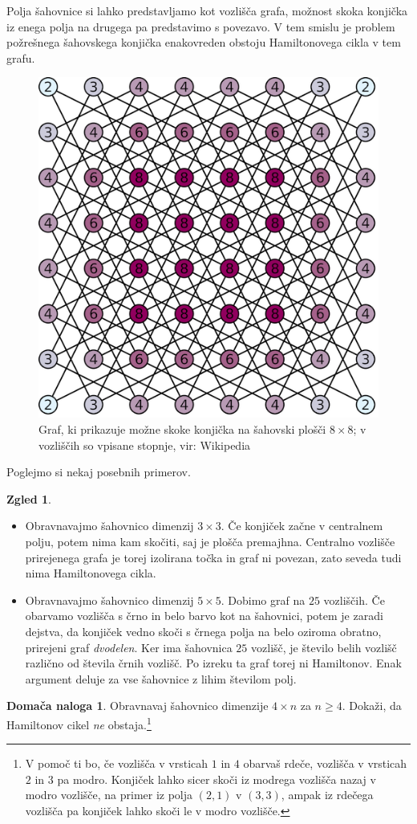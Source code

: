 \documentclass[11pt]{book}
\theoremstyle{definition}
\theoremstyle{zgled}
\newtheorem*{zgled}{Zgled}
\theoremstyle{odprtproblem}
\theoremstyle{domacanaloga}
\newtheorem*{domacanaloga}{Domača naloga}
\theoremstyle{izrek}
\begin{document}
Polja šahovnice si lahko predstavljamo kot vozlišča grafa, možnost skoka konjička iz enega polja na drugega pa predstavimo s povezavo. V tem smislu je problem požrešnega šahovskega konjička enakovreden obstoju Hamiltonovega cikla v tem grafu.

\begin{figure}[h]
    \centering
    \includegraphics[width=0.5\linewidth]{img/grafi-konjicek-graf.png}
    \caption{Graf, ki prikazuje možne skoke konjička na šahovski plošči $8 \times 8$; v vozliščih so vpisane stopnje, vir: Wikipedia}
\end{figure}    

Poglejmo si nekaj posebnih primerov.

\begin{zgled} \leavevmode
\begin{itemize}
    \item Obravnavajmo šahovnico dimenzij $3 \times 3$. Če konjiček začne v centralnem polju, potem nima kam skočiti, saj je plošča premajhna. Centralno vozlišče prirejenega grafa je torej izolirana točka in graf ni povezan, zato seveda tudi nima Hamiltonovega cikla.
    \item Obravnavajmo šahovnico dimenzij $5 \times 5$. Dobimo graf na $25$ vozliščih. Če obarvamo vozlišča s črno in belo barvo kot na šahovnici, potem je zaradi dejstva, da konjiček vedno skoči s črnega polja na belo oziroma obratno, prirejeni graf \emph{dvodelen}. Ker ima šahovnica $25$ vozlišč, je število belih vozlišč različno od števila črnih vozlišč. Po izreku ta graf torej ni Hamiltonov. Enak argument deluje za vse šahovnice z lihim številom polj.
\end{itemize}
\end{zgled}

\begin{domacanaloga}
    Obravnavaj šahovnico dimenzije $4 \times n$ za $n \geq 4$. Dokaži, da Hamiltonov cikel \emph{ne} obstaja.\footnote{V pomoč ti bo, če vozlišča v vrsticah $1$ in $4$ obarvaš rdeče, vozlišča v vrsticah $2$ in $3$ pa modro. Konjiček lahko sicer skoči iz modrega vozlišča nazaj v modro vozlišče, na primer iz polja $(2,1)$ v $(3,3)$, ampak iz rdečega vozlišča pa konjiček lahko skoči le v modro vozlišče.}
\end{domacanaloga}
\end{document}

